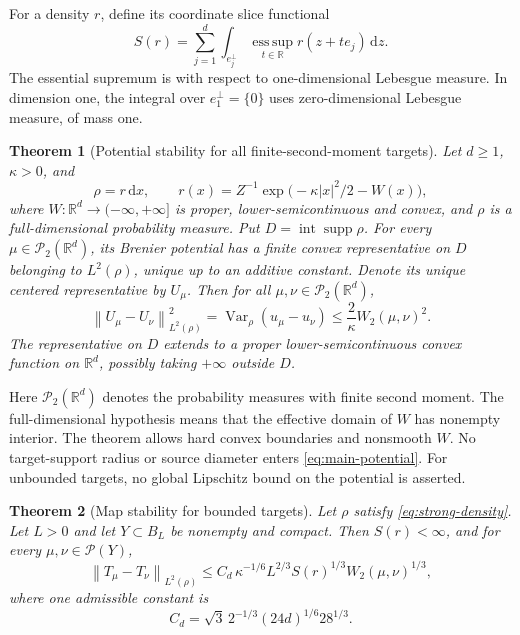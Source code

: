 \documentclass[11pt]{article}
\numberwithin{equation}{section}
\newtheorem{theorem}{Theorem}[section]
\theoremstyle{remark}
\newcommand{\R}{\mathbb R}
\newcommand{\Prob}{\mathcal P}
\newcommand{\Var}{\operatorname{Var}}
\newcommand{\supp}{\operatorname{supp}}
\newcommand{\esssup}{\operatorname*{ess\,sup}}
\newcommand{\dd}{\,\mathrm d}
\newcommand{\interior}{\operatorname{int}}
\newcommand{\norm}[1]{\left\lVert #1\right\rVert}
\begin{document}
For a density $r$, define its coordinate slice functional
\begin{equation}\label{eq:slice-functional}
 S(r)=\sum_{j=1}^d\int_{e_j^\perp}
       \esssup_{t\in\R} r(z+t e_j)\dd z.
\end{equation}
The essential supremum is with respect to one-dimensional Lebesgue measure. In dimension one, the integral over $e_1^\perp=\{0\}$ uses zero-dimensional Lebesgue measure, of mass one.

\begin{theorem}[Potential stability for all finite-second-moment targets]\label{thm:strong}
Let $d\ge1$, $\kappa>0$, and
\begin{equation}\label{eq:strong-density}
 \rho=r\dd x,\qquad
 r(x)=Z^{-1}\exp\bigl(-\kappa|x|^2/2-W(x)\bigr),
\end{equation}
where $W:\R^d\to(-\infty,+\infty]$ is proper, lower-semicontinuous and convex, and $\rho$ is a full-dimensional probability measure. Put $D=\interior\supp\rho$. For every $\mu\in\Prob_2(\R^d)$, its Brenier potential has a finite convex representative on $D$ belonging to $L^2(\rho)$, unique up to an additive constant. Denote its unique centered representative by $U_\mu$. Then for all $\mu,\nu\in\Prob_2(\R^d)$,
\begin{equation}\label{eq:main-potential}
 \norm{U_\mu-U_\nu}_{L^2(\rho)}^2
 =\Var_\rho(u_\mu-u_\nu)
 \le \frac{2}{\kappa}W_2(\mu,\nu)^2.
\end{equation}
The representative on $D$ extends to a proper lower-semicontinuous convex function on $\R^d$, possibly taking $+\infty$ outside $D$.
\end{theorem}

Here $\Prob_2(\R^d)$ denotes the probability measures with finite second moment. The full-dimensional hypothesis means that the effective domain of $W$ has nonempty interior. The theorem allows hard convex boundaries and nonsmooth $W$. No target-support radius or source diameter enters \eqref{eq:main-potential}. For unbounded targets, no global Lipschitz bound on the potential is asserted.

\begin{theorem}[Map stability for bounded targets]\label{thm:maps}
Let $\rho$ satisfy \eqref{eq:strong-density}. Let $L>0$ and let $Y\subset B_L$ be nonempty and compact. Then $S(r)<\infty$, and for every $\mu,\nu\in\Prob(Y)$,
\begin{equation}\label{eq:main-map}
 \norm{T_\mu-T_\nu}_{L^2(\rho)}
 \le C_d\,\kappa^{-1/6}L^{2/3}S(r)^{1/3}
          W_2(\mu,\nu)^{1/3},
\end{equation}
where one admissible constant is
\begin{equation}\label{eq:main-constant}
 C_d=\sqrt3\,2^{-1/3}(24d)^{1/6}28^{1/3}.
\end{equation}
\end{theorem}
\end{document}
